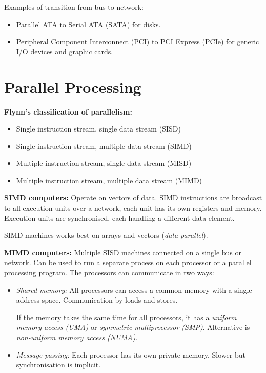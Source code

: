 \documentclass[12pt]{article}
\begin{document}
Examples of transition from bus to network:
\begin{itemize}
    \item Parallel ATA to Serial ATA (SATA) for disks.
    \item Peripheral Component Interconnect (PCI) to PCI Express (PCIe) for generic I/O devices and graphic cards.
\end{itemize}

\section{Parallel Processing}
\textbf{Flynn's classification of parallelism:}
\begin{itemize}
    \item Single instruction stream, single data stream (SISD)
    \item Single instruction stream, multiple data stream (SIMD)
    \item Multiple instruction stream, single data stream (MISD)
    \item Multiple instruction stream, multiple data stream (MIMD)
\end{itemize}

\textbf{SIMD computers:} Operate on vectors of data. SIMD instructions are broadcast to all execution units over a network, each unit has its own registers and memory. Execution units are synchronised, each handling a different data element.

SIMD machines works best on arrays and vectors (\textit{data parallel}).

\textbf{MIMD computers:} Multiple SISD machines connected on a single bus or network. Can be used to run a separate process on each processor or a parallel processing program. The processors can communicate in two ways:
\begin{itemize}
    \item \textit{Shared memory:} All processors can access a common memory with a single address space. Communication by loads and stores. 
    
    If the memory takes the same time for all processors, it has a \textit{uniform memory access (UMA)} or \textit{symmetric multiprocessor (SMP)}. Alternative is \textit{non-uniform memory access (NUMA)}.
    \item \textit{Message passing:} Each processor has its own private memory. Slower but synchronisation is implicit.
\end{itemize}
\end{document}
